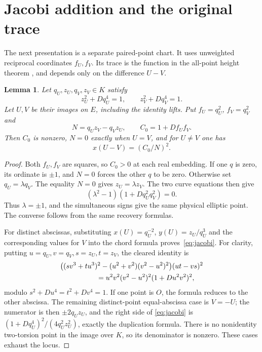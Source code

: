 \documentclass[11pt,a4paper]{article}
\newtheorem{lemma}[theorem]{Lemma}
\begin{document}
\section{Jacobi addition and the original trace}
The next presentation is a separate paired-point chart. It uses
unweighted reciprocal coordinates $f_U,f_V$.
Its trace is the function in the all-point height theorem
\cite[Theorem 1.1]{Trace}, and depends only on the difference $U-V$.

\begin{lemma}\label{lem:jacobi}
Let $q_U,z_U,q_V,z_V\in K$ satisfy
\[
 z_U^2+Dq_U^4=1,\qquad z_V^2+Dq_V^4=1.
\]
Let $U,V$ be their images on $E$, including the identity lifts.
Put $f_U=q_U^2$, $f_V=q_V^2$ and
\[
 N=q_Uz_V-q_Vz_U,\qquad C_0=1+Df_Uf_V.
\]
Then $C_0$ is nonzero, $N=0$ exactly when $U=V$, and for
$U\ne V$ one has
\begin{equation}\label{eq:jacobi}
                  x(U-V)=(C_0/N)^2.
\end{equation}
\end{lemma}
\begin{proof}
Both $f_U,f_V$ are squares, so $C_0>0$ at each real embedding.
If one $q$ is zero, its ordinate is $\pm1$, and $N=0$ forces
the other $q$ to be zero. Otherwise set $q_U=\lambda q_V$.
The equality $N=0$ gives $z_U=\lambda z_V$. The two curve equations
then give
\[
               (\lambda^2-1)(1+Dq_U^2q_V^2)=0.
\]
Thus $\lambda=\pm1$, and the simultaneous signs give the same
physical elliptic point. The converse follows from the same recovery
formulas.

For distinct abscissas, substituting
$x(U)=q_U^{-2}$, $y(U)=z_U/q_U^3$ and the corresponding values
for $V$ into the chord formula proves~\eqref{eq:jacobi}.
For clarity, putting $u=q_U,v=q_V,s=z_U,t=z_V$, the cleared
identity is
\begin{align*}
 &\bigl((sv^3+tu^3)^2-(u^2+v^2)(v^2-u^2)^2\bigr)(ut-vs)^2\\
 &\hspace{18mm}=u^2v^2(v^2-u^2)^2(1+Du^2v^2)^2,
\end{align*}
modulo $s^2+Du^4=t^2+Dv^4=1$.
If one point is $O$, the formula reduces to the other abscissa.
The remaining distinct-point equal-abscissa case is $V=-U$;
the numerator is then $\pm2q_Uz_U$, and the right side of
\eqref{eq:jacobi} is
$(1+Dq_U^4)^2/(4q_U^2z_U^2)$, exactly the duplication formula.
There is no nonidentity two-torsion point in the image over $K$,
so its denominator is nonzero. These cases exhaust the locus.
\end{proof}
\end{document}

